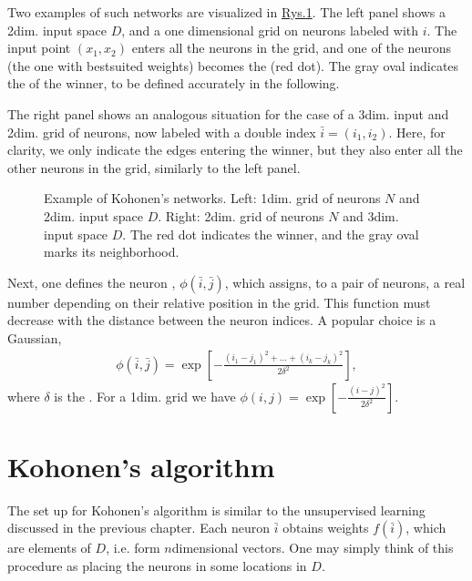 \documentclass[a4paper,12pt,polish]{jupyterBook}
\let\sphinxpxdimen\pdfpxdimen\else\newdimen\sphinxpxdimen
\begin{document}
\sphinxAtStartPar
Two examples of such networks are visualized in \hyperref[\detokenize{docs/som:koh-fig}]{Rys.\@ \ref{\detokenize{docs/som:koh-fig}}}. The left panel shows a 2\sphinxhyphen{}dim. input space \(D\), and a one dimensional grid on neurons labeled with \(i\). The input point \((x_1,x_2)\) enters all the neurons in the grid, and one of the neurons (the one with best\sphinxhyphen{}suited weights) becomes the  (red dot). The gray oval indicates the  of the winner, to be defined accurately in the following.

\sphinxAtStartPar
The right panel shows an analogous situation for the case of a 3\sphinxhyphen{}dim. input and 2\sphinxhyphen{}dim. grid of neurons, now labeled with a double index \(\bar {i} = (i_1, i_2)\). Here, for clarity, we only indicate the edges entering the winner, but they also enter all the other neurons in the grid, similarly to the left panel.

\begin{figure}[htbp]
\centering
\capstart

\noindent\sphinxincludegraphics[width=500\sphinxpxdimen]{{koha}.png}
\caption{Example of Kohonen’s networks. Left: 1\sphinxhyphen{}dim. grid of neurons \(N\) and 2\sphinxhyphen{}dim. input space \(D\). Right: 2\sphinxhyphen{}dim. grid of neurons \(N\) and 3\sphinxhyphen{}dim. input space \(D\). The red dot indicates the winner, and the gray oval marks its neighborhood.}\label{\detokenize{docs/som:koh-fig}}\end{figure}

\sphinxAtStartPar
Next, one defines the neuron , \(\phi (\bar {i}, \bar {j})\), which assigns, to a pair of neurons, a real number depending on their relative position in the grid. This function must decrease with the distance between the neuron indices. A popular choice is a Gaussian,
\begin{equation*}
\begin{split} \phi(\bar{i}, \bar{j})=\exp\left [ -\frac{(i_1-j_1)^2+...+(i_k-j_k)^2}{2 \delta^2} \right ] ,\end{split}
\end{equation*}
\sphinxAtStartPar
where \(\delta\) is the . For a 1\sphinxhyphen{}dim. grid we have \( \phi(i,j)=\exp\left [ -\frac{(i-j)^2}{2 \delta^2} \right ]\).


\section{Kohonen’s algorithm}
\label{\detokenize{docs/som:kohonen-s-algorithm}}
\sphinxAtStartPar
The set up for Kohonen’s algorithm is similar to the unsupervised learning discussed in the previous chapter. Each neuron \(\bar{i}\) obtains weights \(f\left(\bar{i}\right)\), which are elements of \(D\), i.e. form \(n\)\sphinxhyphen{}dimensional vectors. One may simply think of this procedure as placing the neurons in some locations in \(D\).
\end{document}
